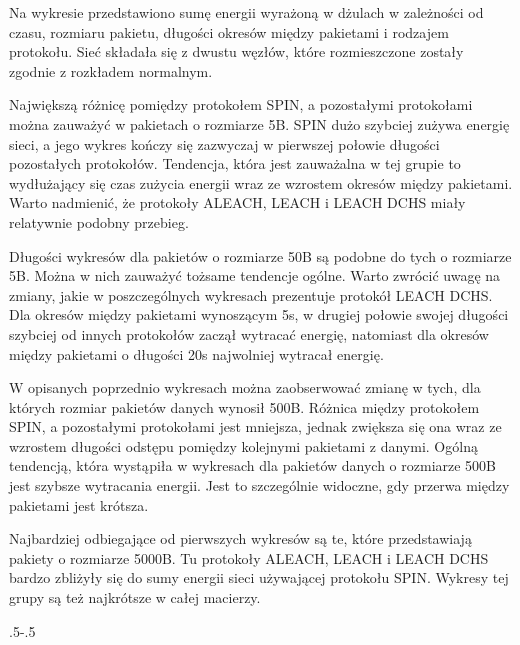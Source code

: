 Na wykresie przedstawiono sumę energii wyrażoną w dżulach w zależności od czasu, rozmiaru pakietu, długości okresów między pakietami i rodzajem protokołu. Sieć składała się z dwustu węzłów, które rozmieszczone zostały zgodnie z rozkładem normalnym.

Największą różnicę pomiędzy protokołem SPIN, a pozostałymi protokołami można zauważyć w pakietach o rozmiarze 5B. SPIN dużo szybciej zużywa energię sieci, a jego wykres kończy się zazwyczaj w pierwszej połowie długości pozostałych protokołów. Tendencja, która jest zauważalna w tej grupie to wydłużający się czas zużycia energii wraz ze wzrostem okresów między pakietami. Warto nadmienić, że protokoły ALEACH, LEACH i LEACH DCHS miały relatywnie podobny przebieg.

Długości wykresów dla pakietów o rozmiarze 50B są podobne do tych o rozmiarze 5B. Można w nich zauważyć tożsame tendencje ogólne. Warto zwrócić uwagę na zmiany, jakie w poszczególnych wykresach prezentuje protokół LEACH DCHS. Dla okresów między pakietami wynoszącym 5s, w drugiej połowie swojej długości szybciej od innych protokołów zaczął wytracać energię, natomiast dla okresów między pakietami o długości 20s najwolniej wytracał energię.

W opisanych poprzednio wykresach można zaobserwować zmianę w tych, dla których rozmiar pakietów danych wynosił 500B. Różnica między protokołem SPIN, a pozostałymi protokołami jest mniejsza, jednak zwiększa się ona wraz ze wzrostem długości odstępu pomiędzy kolejnymi pakietami z danymi. Ogólną tendencją, która wystąpiła w wykresach dla pakietów danych o rozmiarze 500B jest szybsze wytracania energii. Jest to szczególnie widoczne, gdy przerwa między pakietami jest krótsza.

Najbardziej odbiegające od pierwszych wykresów są te, które przedstawiają pakiety o rozmiarze 5000B. Tu protokoły ALEACH, LEACH i LEACH DCHS bardzo zbliżyły się do sumy energii sieci używającej protokołu SPIN. Wykresy tej grupy są też najkrótsze w całej macierzy.

\clearpage
\thispagestyle{empty}

{\pdfpagewidth
    \vspace*{-2cm}
    \noindent\kern.5\pdfpagewidth{}\kern-.5\pdfpagewidth
     \par
     \vspace*{-5cm}
\clearpage
}

